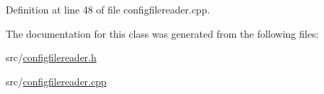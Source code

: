 Definition at line 48 of file configfilereader.\+cpp.



The documentation for this class was generated from the following files\+:\begin{DoxyCompactItemize}
\item 
src/\mbox{\hyperlink{configfilereader_8h}{configfilereader.\+h}}\item 
src/\mbox{\hyperlink{configfilereader_8cpp}{configfilereader.\+cpp}}\end{DoxyCompactItemize}
